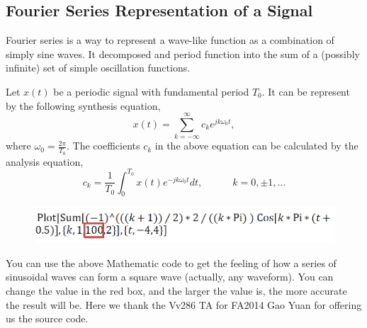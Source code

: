 \documentclass{article}
\begin{document}
\subsection{Fourier Series Representation of a Signal}

Fourier series is a way to represent a wave-like function as a combination of simply sine waves. It decomposed and period function into the sum of a (possibly infinite) set of simple oscillation functions.

Let $x(t)$ be a periodic signal with fundamental period $T_0$. It can be represent by the following synthesis equation,
$$x(t) = \sum^\infty_{k=-\infty}c_ke^{jk\omega_0t},$$
where $\omega_0=\frac{2\pi}{T_0}$. The coefficients $c_k$ in the above equation can be calculated by the analysis equation,
$$c_k = \frac{1}{T_0}\int^{T_0}_{0}x(t)e^{-jk\omega_0t}dt,\hspace{3em}k=0, \pm 1,...$$

\begin{figure}[H]\centering
    \includegraphics[scale=1.0]{code.png}
\end{figure}

You can use the above Mathematic code to get the feeling of how a series of
sinusoidal waves can form a square wave (actually, any waveform). You can
change the value in the red box, and the larger the value is, the more accurate the
result will be. Here we thank the Vv286 TA for FA2014 Gao Yuan for offering us the source
code.\\
\end{document}
